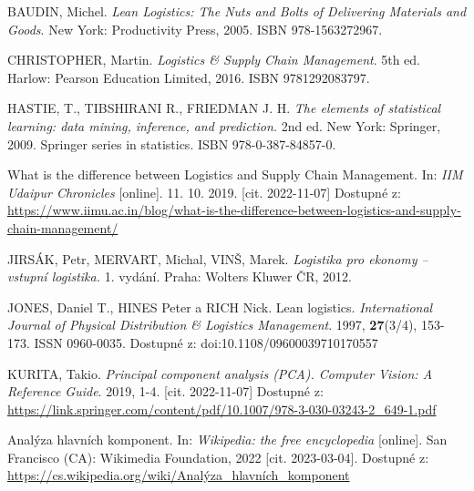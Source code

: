 



\begin{thebibliography}{1}

BAUDIN, Michel. \textit{Lean Logistics: The Nuts and Bolts of Delivering Materials and Goods}. New York: Productivity Press, 2005. ISBN 978-1563272967.

CHRISTOPHER, Martin. \textit{Logistics \& Supply Chain Management}. 5th ed. Harlow: Pearson Education Limited, 2016. ISBN 9781292083797.

HASTIE, T., TIBSHIRANI R., FRIEDMAN J. H. \textit{The elements of statistical learning: data
mining, inference, and prediction.} 2nd ed. New York: Springer, 2009. Springer series in statistics. ISBN 978-0-387-84857-0.

What is the difference between Logistics and Supply Chain Management. In: \textit{IIM Udaipur Chronicles} [online]. 11. 10. 2019. [cit. 2022-11-07] Dostupné z: \url{https://www.iimu.ac.in/blog/what-is-the-difference-between-logistics-and-supply-chain-management/}

JIRSÁK, Petr, MERVART, Michal, VINŠ, Marek. \textit{Logistika pro ekonomy -- vstupní logistika.} 1. vydání. Praha: Wolters Kluwer ČR, 2012.

JONES, Daniel T., HINES Peter  a RICH Nick. Lean logistics. \textit{International Journal of Physical Distribution \& Logistics Management}. 1997, \textbf{27}(3/4), 153-173. ISSN 0960-0035. Dostupné z: doi:10.1108/09600039710170557

KURITA, Takio. \textit{Principal component analysis (PCA). Computer Vision: A Reference Guide}. 2019, 1-4. [cit. 2022-11-07] Dostupné z: \url{https://link.springer.com/content/pdf/10.1007/978-3-030-03243-2\_649-1.pdf}

Analýza hlavních komponent. In: \textit{Wikipedia: the free encyclopedia} [online]. San Francisco (CA): Wikimedia Foundation, 2022 [cit. 2023-03-04]. Dostupné z: \url{https://cs.wikipedia.org/wiki/Analýza\_hlavních\_komponent}


\end{thebibliography}
